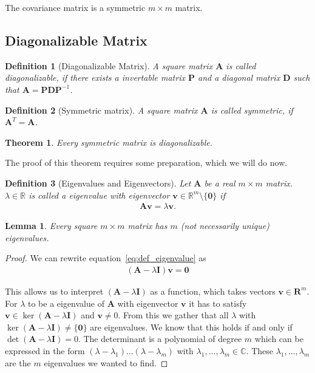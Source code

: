\documentclass[a4paper]{IEEEtran}
\newtheorem{definition}{Definition}
\newtheorem{lemma}{Lemma}
\newtheorem{theorem}{Theorem}
\begin{document}
The covariance matrix is a symmetric $m\times m$ matrix.

\subsection{Diagonalizable Matrix}

\begin{definition}[Diagonalizable Matrix]
	A square matrix $\mathbf{A}$ is called \textit{diagonalizable}, if there exists a invertable matrix $\mathbf{P}$ and a diagonal matrix $\mathbf{D}$ such that $\mathbf{A} = \mathbf{P}\mathbf{D}\mathbf{P}^{-1}$.
\end{definition}

\begin{definition}[Symmetric matrix]
	A square matrix $\mathbf{A}$ is called \textit{symmetric}, if $\mathbf{A}^T = \mathbf{A}$.
\end{definition}

\begin{theorem}
	\label{th:symmetric_matrix_diagonalizable}
	Every symmetric matrix is diagonalizable.
\end{theorem}

The proof of this theorem requires some preparation, which we will do now.

\begin{definition}[Eigenvalues and Eigenvectors]
	Let $\mathbf{A}$ be a real $m\times m$ matrix. $\lambda \in \mathbb{R}$ is called a \textit{eigenvalue} with \textit{eigenvector} $\mathbf{v} \in \mathbb{R}^m\setminus\{\mathbf{0}\}$ if
	\begin{align}
		\label{eq:def_eigenvalue}
		\mathbf{Av} = \lambda \mathbf{v}.
	\end{align}
\end{definition}

\begin{lemma}
	\label{lem:existence_eigenvalues}
	Every square $m\times m$ matrix has $m$ (not necessarily unique) eigenvalues.
\end{lemma}

\begin{proof}
	We can rewrite equation~\ref{eq:def_eigenvalue} as
	\begin{align*}
		(\mathbf{A} - \lambda \mathbf{I})\mathbf{v} = \mathbf{0}
	\end{align*}
	
	This allows us to interpret $(\mathbf{A}-\lambda \mathbf{I})$ as a function, which takes vectors $\mathbf{v} \in \mathbf{R}^m$. For $\lambda$ to be a eigenvalue of $\mathbf{A}$ with eigenvector $\mathbf{v}$ it has to satisfy $\mathbf{v} \in \ker(\mathbf{A} - \lambda \mathbf{I})$ and $\mathbf{v} \neq 0$. From this we gather that all $\lambda$ with $\ker(\mathbf{A} - \lambda \mathbf{I}) \neq \{\mathbf{0}\}$ are eigenvalues. We know that this holds if and only if $\det(\mathbf{A} - \lambda \mathbf{I}) = 0$. The determinant is a polynomial of degree $m$ which can be expressed in the form $(\lambda - \lambda_1)...(\lambda - \lambda_m)$ with $\lambda_1, ..., \lambda_m \in \mathbb{C}$. These $\lambda_1, ..., \lambda_m$ are the $m$ eigenvalues we wanted to find.
\end{proof}
\end{document}
